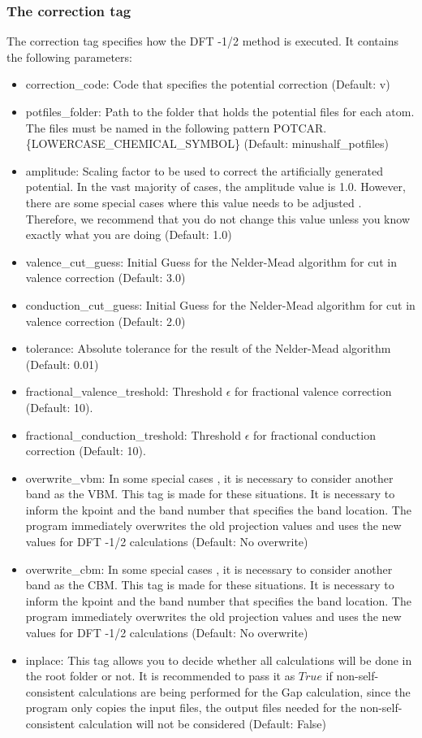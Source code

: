  \subsubsection{The correction tag}
 The correction tag specifies how the DFT -1/2 method is executed. It contains the following parameters:
 
 \begin{itemize}
     \item correction\_code: Code that specifies the potential correction (Default: v)
     \item potfiles\_folder: Path to the folder that holds the potential files for each atom. The files must be named in the following pattern POTCAR.\{LOWERCASE\_CHEMICAL\_SYMBOL\} (Default: minushalf\_potfiles)
     \item amplitude: Scaling factor to be used to correct the artificially generated potential. In the vast majority of cases, the amplitude value is 1.0. However, there are some special cases where this value needs to be adjusted \cite{PhysRevB.95.045126}. Therefore, we recommend that you do not change this value unless you know exactly what you are doing (Default: 1.0)
     \item valence\_cut\_guess: Initial Guess for the Nelder-Mead algorithm for cut in valence correction (Default: 3.0)
     \item conduction\_cut\_guess: Initial Guess for the Nelder-Mead algorithm for cut in valence correction (Default: 2.0)
     \item tolerance: Absolute tolerance for the result of the Nelder-Mead algorithm (Default: 0.01)
     \item fractional\_valence\_treshold: Threshold $\epsilon$ for fractional valence correction (Default: 10).
     \item fractional\_conduction\_treshold: Threshold $\epsilon$ for fractional conduction correction (Default: 10).
     \item overwrite\_vbm: In some special cases \cite{PhysRevB.95.045126}, it is necessary to consider another band as the VBM. This tag is made for these situations. It is necessary to inform the kpoint and the band number that specifies the band location. The program immediately overwrites the old projection values and uses the new values for DFT -1/2 calculations (Default: No overwrite)
     \item overwrite\_cbm: In some special cases \cite{PhysRevB.95.045126}, it is necessary to consider another band as the CBM. This tag is made for these situations. It is necessary to inform the kpoint and the band number that specifies the band location. The program immediately overwrites the old projection values and uses the new values for DFT -1/2 calculations (Default: No overwrite)
    \item inplace: This tag allows you to decide whether all calculations will be done in the root folder or not. It is recommended to pass it as $True$ if non-self-consistent calculations are being performed for the Gap calculation, since the program only copies the input files, the output files needed for the non-self-consistent calculation will not be considered (Default: False)
 \end{itemize}
 
